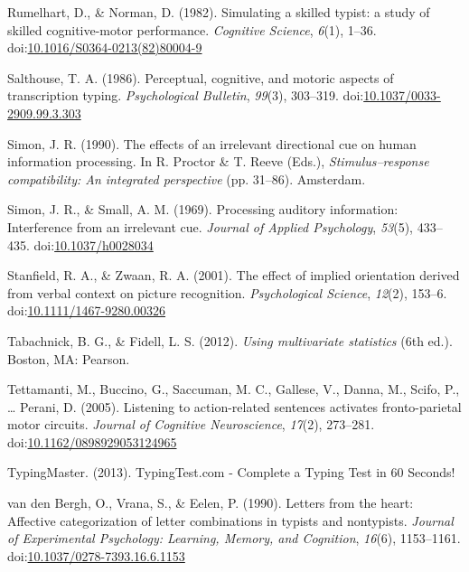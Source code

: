 \documentclass[english,man, mask]{apa6}
\theoremstyle{definition}
\theoremstyle{definition}
\theoremstyle{definition}
\theoremstyle{remark}
\begin{document}
\hypertarget{ref-Rumelhart1982}{}
Rumelhart, D., \& Norman, D. (1982). Simulating a skilled typist: a
study of skilled cognitive-motor performance. \emph{Cognitive Science},
\emph{6}(1), 1--36.
doi:\href{https://doi.org/10.1016/S0364-0213(82)80004-9}{10.1016/S0364-0213(82)80004-9}

\hypertarget{ref-Salthouse1986}{}
Salthouse, T. A. (1986). Perceptual, cognitive, and motoric aspects of
transcription typing. \emph{Psychological Bulletin}, \emph{99}(3),
303--319.
doi:\href{https://doi.org/10.1037/0033-2909.99.3.303}{10.1037/0033-2909.99.3.303}

\hypertarget{ref-Simon1990}{}
Simon, J. R. (1990). The effects of an irrelevant directional cue on
human information processing. In R. Proctor \& T. Reeve (Eds.),
\emph{Stimulus--response compatibility: An integrated perspective} (pp.
31--86). Amsterdam.

\hypertarget{ref-Simon1969}{}
Simon, J. R., \& Small, A. M. (1969). Processing auditory information:
Interference from an irrelevant cue. \emph{Journal of Applied
Psychology}, \emph{53}(5), 433--435.
doi:\href{https://doi.org/10.1037/h0028034}{10.1037/h0028034}

\hypertarget{ref-Stanfield2001}{}
Stanfield, R. A., \& Zwaan, R. A. (2001). The effect of implied
orientation derived from verbal context on picture recognition.
\emph{Psychological Science}, \emph{12}(2), 153--6.
doi:\href{https://doi.org/10.1111/1467-9280.00326}{10.1111/1467-9280.00326}

\hypertarget{ref-Tabachnick2012}{}
Tabachnick, B. G., \& Fidell, L. S. (2012). \emph{Using multivariate
statistics} (6th ed.). Boston, MA: Pearson.

\hypertarget{ref-Tettamanti2005}{}
Tettamanti, M., Buccino, G., Saccuman, M. C., Gallese, V., Danna, M.,
Scifo, P., \ldots{} Perani, D. (2005). Listening to action-related
sentences activates fronto-parietal motor circuits. \emph{Journal of
Cognitive Neuroscience}, \emph{17}(2), 273--281.
doi:\href{https://doi.org/10.1162/0898929053124965}{10.1162/0898929053124965}

\hypertarget{ref-Inc2013}{}
TypingMaster. (2013). TypingTest.com - Complete a Typing Test in 60
Seconds!

\hypertarget{ref-VandenBergh1990}{}
van den Bergh, O., Vrana, S., \& Eelen, P. (1990). Letters from the
heart: Affective categorization of letter combinations in typists and
nontypists. \emph{Journal of Experimental Psychology: Learning, Memory,
and Cognition}, \emph{16}(6), 1153--1161.
doi:\href{https://doi.org/10.1037/0278-7393.16.6.1153}{10.1037/0278-7393.16.6.1153}
\end{document}
